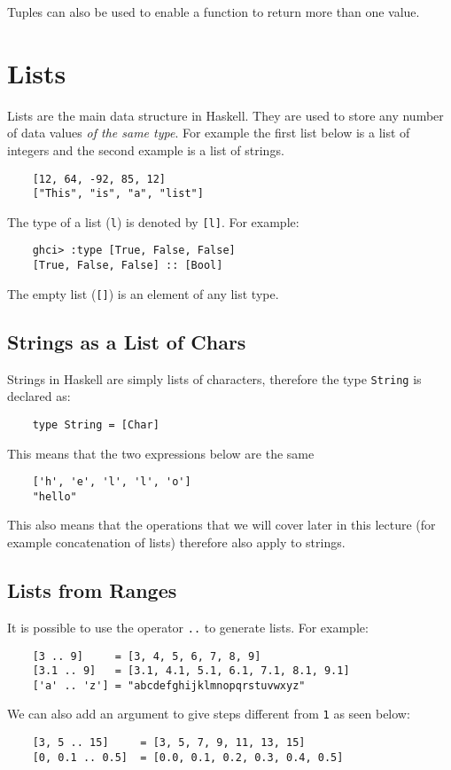 Tuples can also be used to enable a function to return more than one value.

\section{Lists}
Lists are the main data structure in Haskell. They are used to store any number of data values \textit{of the same type}. For example the first list below is a list of integers and the second example is a list of strings.
\begin{verbatim}
    [12, 64, -92, 85, 12]
    ["This", "is", "a", "list"]
\end{verbatim}

The type of a list (\verb|l|) is denoted by \verb|[l]|. For example:
\begin{verbatim}
    ghci> :type [True, False, False]
    [True, False, False] :: [Bool]
\end{verbatim}
The empty list (\verb|[]|) is an element of any list type.

\subsection{Strings as a List of Chars}
Strings in Haskell are simply lists of characters, therefore the type \verb|String| is declared as:
\begin{verbatim}
    type String = [Char]
\end{verbatim}
This means that the two expressions below are the same
\begin{verbatim}
    ['h', 'e', 'l', 'l', 'o']
    "hello"
\end{verbatim}

This also means that the operations that we will cover later in this lecture (for example concatenation of lists) therefore also apply to strings.

\subsection{Lists from Ranges}
It is possible to use the operator \verb|..| to generate lists. For example:
\begin{verbatim}
    [3 .. 9]     = [3, 4, 5, 6, 7, 8, 9]
    [3.1 .. 9]   = [3.1, 4.1, 5.1, 6.1, 7.1, 8.1, 9.1]
    ['a' .. 'z'] = "abcdefghijklmnopqrstuvwxyz"
\end{verbatim}

We can also add an argument to give steps different from \verb|1| as seen below:
\begin{verbatim}
    [3, 5 .. 15]     = [3, 5, 7, 9, 11, 13, 15]
    [0, 0.1 .. 0.5]  = [0.0, 0.1, 0.2, 0.3, 0.4, 0.5]
\end{verbatim}

